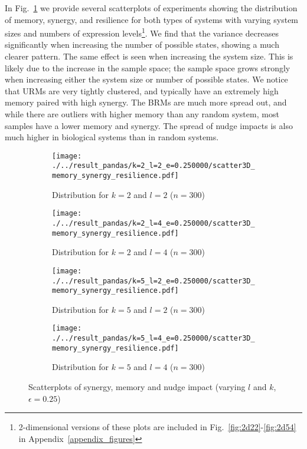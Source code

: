\documentclass[../main.tex]{subfiles}
\begin{document}
In Fig.~\ref{fig:3dscatter} we provide several scatterplots of experiments showing the distribution of memory, synergy, and resilience for both types of systems with varying system sizes and numbers of expression levels\footnote{2-dimensional versions of these plots are included in Fig.~\ref{fig:2d22}-\ref{fig:2d54} in Appendix~\ref{appendix_figures}}.
We find that the variance decreases significantly when increasing the number of possible states, showing a much clearer pattern.
The same effect is seen when increasing the system size.
This is likely due to the increase in the sample space; the sample space grows strongly when increasing either the system size or number of possible states.
We notice that URMs are very tightly clustered, and typically have an extremely high memory paired with high synergy.
The BRMs are much more spread out, and while there are outliers with higher memory than any random system, most samples have a lower memory and synergy.
The spread of nudge impacts is also much higher in biological systems than in random systems.

\begin{figure}[ht]
    \centering
    \begin{subfigure}[b]{0.48\textwidth}
        \texttt{[image: ./../result\_pandas/k=2\_l=2\_e=0.250000/scatter3D\_memory\_synergy\_resilience.pdf]}
        \caption{Distribution for $k=2$ and $l=2$ ($n=300$)}
    \end{subfigure}
    \begin{subfigure}[b]{0.48\textwidth}
        \texttt{[image: ./../result\_pandas/k=2\_l=4\_e=0.250000/scatter3D\_memory\_synergy\_resilience.pdf]}
        \caption{Distribution for $k=2$ and $l=4$ ($n=300$)}
    \end{subfigure}
\bigskip
    \begin{subfigure}[b]{0.48\textwidth}
        \texttt{[image: ./../result\_pandas/k=5\_l=2\_e=0.250000/scatter3D\_memory\_synergy\_resilience.pdf]}
        \caption{Distribution for $k=5$ and $l=2$ ($n=300$)}
    \end{subfigure}
    \begin{subfigure}[b]{0.48\textwidth}
        \texttt{[image: ./../result\_pandas/k=5\_l=4\_e=0.250000/scatter3D\_memory\_synergy\_resilience.pdf]}
        \caption{Distribution for $k=5$ and $l=4$ ($n=300$)}
    \end{subfigure}
    \caption{Scatterplots of synergy, memory and nudge impact (varying $l$ and $k$, $\epsilon = 0.25$)}
    \label{fig:3dscatter}
\end{figure}
\end{document}
